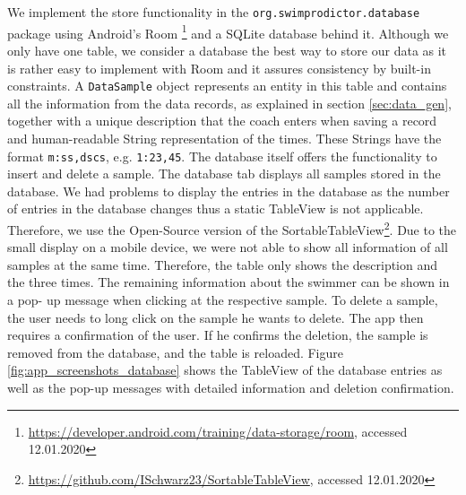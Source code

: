 We implement the store functionality in the \texttt{org.swimprodictor.database} package using Android's Room \footnote{\url{https://developer.android.com/training/data-storage/room}, accessed 12.01.2020} and a SQLite database behind it. Although we only have one table, we consider a database the best way to store our data as it is rather easy to implement with Room and it assures consistency by built-in constraints. A \texttt{DataSample} object represents an entity in this table and contains all the information from the data records, as explained in section \ref{sec:data_gen}, together with a unique description that the coach enters when saving a record and human-readable String representation of the times. These Strings have the format \texttt{m:ss,dscs}, e.g. \texttt{1:23,45}. The database itself offers the functionality to insert and delete a sample. The database tab displays all samples stored in the database. We had problems to display the entries in the database as the number of entries in the database changes thus a static TableView is not applicable. Therefore, we use the Open-Source version of the SortableTableView\footnote{\url{https://github.com/ISchwarz23/SortableTableView}, accessed 12.01.2020}. Due to the small display on a mobile device, we were not able to show all information of all samples at the same time. Therefore, the table only shows the description and the three times. The remaining information about the swimmer can be shown in a pop- up message when clicking at the respective sample. To delete a sample, the user needs to long click on the sample he wants to delete. The app then requires a confirmation of the user. If he confirms the deletion, the sample is removed from the database, and the table is reloaded. Figure \ref{fig:app_screenshots_database} shows the TableView of the database entries as well as the pop-up messages with detailed information and deletion confirmation.
